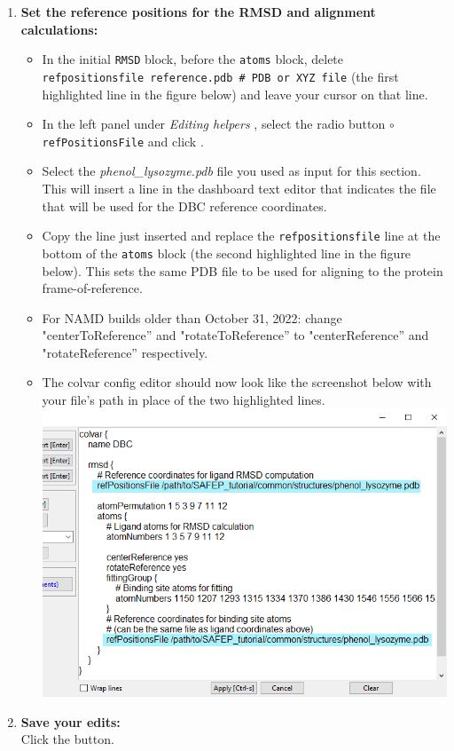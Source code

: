\documentclass[9pt,tutorial]{Styling/livecoms}
\newcommand{\filepath}[1]{\textit{#1}}
\newcommand{\button}[1]{
  \inlineBox[gray]{\texttt{#1}}
}
\newcommand{\menu}[1]{
  \textit{#1}
}
\newcommand{\option}[1]{
  \texttt{#1}
}
\newcommand{\textInput}[1]{
  \texttt{#1}
}
\begin{document}
\begin{enumerate}
\begin{enumerate}[label=\alph*., ref=\theenumi.\alph*]
             \item \textbf{Set the reference positions for the RMSD and alignment calculations:} 
             \begin{itemize}
                 \item In the initial \textInput{RMSD} block, before the \textInput{atoms} block, delete \textInput{refpositionsfile reference.pdb \# PDB or XYZ file} (the first highlighted line in the figure below) and leave your cursor on that line.
                \item In the left panel under \menu{Editing helpers}, select the radio button \option{$\circ$  refPositionsFile} and click \button{Pick File}. 
                \item Select the \filepath{phenol\_lysozyme.pdb} file you used as input for this section. This will insert a line in the dashboard text editor that indicates the file that will be used for the DBC reference coordinates.
                \item Copy the line just inserted and replace the \textInput{refpositionsfile} line at the bottom of the \textInput{atoms} block (the second highlighted line in the figure below). This sets the same PDB file to be used for aligning to the protein frame-of-reference.
                \item For NAMD builds older than October 31, 2022: change "centerToReference'' and "rotateToReference'' to "centerReference'' and "rotateReference'' respectively.
                \item The colvar config editor should now look like the screenshot below with your file's path in place of the two highlighted lines.\\
                \includegraphics[width=0.75\linewidth ]{CV_dashboard_StepA.png} \label{fig:refposfiles}
            \end{itemize}
            \item \textbf{Save your edits:}\\
            Click the \button{Apply [Ctrl-s]} button.
        \end{enumerate}
        

\end{enumerate}
\end{document}
